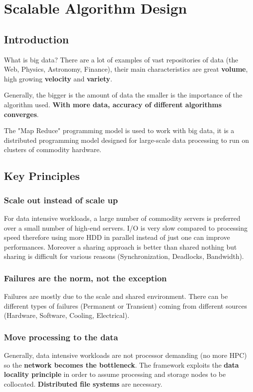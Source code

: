 \chapter{Scalable Algorithm Design}

\section{Introduction}
\par
What is big data? There are a lot of examples of vast repositories of data (the Web, Physics, Astronomy, Finance), their main characteristics are great \textbf{volume}, high growing \textbf{velocity} and \textbf{variety}.
\par\noindent
Generally, the bigger is the amount of data the smaller is the importance of the algorithm used. \textbf{With more data, accuracy of different algorithms converges}.
\par\noindent
The "Map Reduce" programming model is used to work with big data, it is a distributed programming model designed for large-scale data processing to run on clusters of commodity hardware.

\section{Key Principles}
\subsection*{Scale out instead of scale up}
For data intensive workloads, a large number of commodity servers is preferred over a small number of high-end servers.
I/O is very slow compared to processing speed therefore using more HDD in parallel instead of just one can improve performances. Moreover a sharing approach is better than shared nothing but sharing is difficult for various reasons (Synchronization, Deadlocks, Bandwidth).
\subsection*{Failures are the norm, not the exception}
Failures are mostly due to the scale and shared environment. There can be different types of failures (Permanent or Transient) coming from different sources (Hardware, Software, Cooling, Electrical).
\subsection*{Move processing to the data}
Generally, data intensive workloads are not processor demanding (no more HPC) so the \textbf{network becomes the bottleneck}. The framework exploits the \textbf{data locality principle} in order to assume processing and storage nodes to be collocated. \textbf{Distributed file systems} are necessary.
